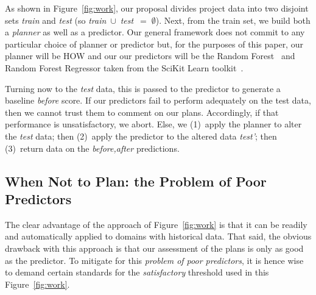 \documentclass[conference]{IEEEtran}
\newcommand{\fig}[1]{Figure~\ref{fig:#1}}
\begin{document}
As shown in \fig{work}, our proposal divides
project data  into two disjoint sets {\em train} and {\em test}
(so \mbox{{\em train} $\cup$ {\em test} $=\;\emptyset$}).
Next, from the train set, we build both a {\em planner} as well
as a {  predictor}. Our general framework does not   commit to any particular  choice
of { planner} or { predictor} but, for the purposes of this paper, 
our { planner}
will be HOW  and our
our { predictors} will be the Random Forest~\cite{Breiman2001} and Random Forest
Regressor taken from the SciKit
Learn toolkit~\cite{Pedregosa2012}.  
%
%


Turning now to the {\em test} data, this is passed to the { predictor}
to generate a baseline {\em before}  score.
If our { predictors} fail to perform adequately on the test data,
then we cannot trust them to comment on our plans. Accordingly,
if that performance is unsatisfactory, we abort.
Else, we (1)~apply the { planner} to alter the {\em test} data;
then (2)~apply the { predictor} to the altered data {\em test'};
then (3)~return data on the {\em before,after} predictions.



\subsection{When Not to Plan: the Problem of Poor Predictors}\label{sec:notplan}

The clear advantage of the approach of \fig{work} is that it can be readily and automatically
applied to domains with historical data. That said, the obvious drawback with this approach
is that our assessment of the plans is only as good as the predictor. To 
mitigate for this {\em problem of poor predictors}, it is hence wise to demand certain standards for the {\em
satisfactory} threshold used in this \fig{work}. 
 
\end{document}
